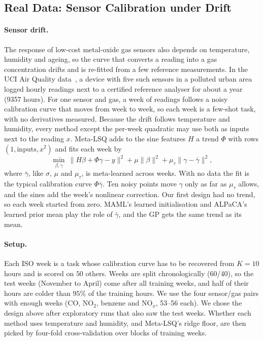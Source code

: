 \documentclass[fullpaper,final]{nldl}
\theoremstyle{plain}
\theoremstyle{definition}
\begin{document}
\subsection{Real Data: Sensor Calibration under Drift}
\label{sec:exp-real}

\paragraph{Sensor drift.} The response of low-cost metal-oxide gas sensors also
depends on temperature, humidity and ageing, so the curve that converts a reading into a gas concentration drifts and is
re-fitted from a few reference measurements. In the UCI Air Quality
data~\citep{devito2008airquality}, a device with five such sensors in a polluted
urban area logged hourly readings next to a certified reference analyser for about a
year (9357 hours). For one sensor and gas, a week of readings follows a
noisy calibration curve that moves from week to week, so each week is a few-shot
task, with no derivatives measured. Because the drift follows temperature and
humidity, every method except the per-week quadratic may use both as inputs next
to the reading $x$. Meta-LSQ adds
to the sine features $H$ a trend $\Phi$ with rows $(1,\text{inputs},x^2)$ and fits
each week by
\begin{equation}
\label{eq:prior-mean}
\min_{\beta,\gamma}\ \|H\beta+\Phi\gamma-y\|^2+\mu\|\beta\|^2+\mu_\tau\|\gamma-\bar\gamma\|^2,
\end{equation}
where $\bar\gamma$, like $\sigma$, $\mu$ and $\mu_\tau$, is meta-learned across weeks.
With no data the fit is the typical calibration curve $\Phi\bar\gamma$. Ten noisy
points move $\gamma$ only as far as $\mu_\tau$ allows, and the sines add the week's
nonlinear correction. Our first design had no trend, so each week started from zero.
MAML's learned initialisation and ALPaCA's learned prior mean play the role of
$\bar\gamma$, and the GP gets the same trend as its mean.

\paragraph{Setup.} Each ISO week is a task whose calibration curve has to be
recovered from $K{=}10$ hours and is scored on $50$ others. Weeks are split
chronologically (60/40), so the test weeks (November to April) come after all
training weeks, and half of their hours are colder than $95\%$ of the training hours.
We use the four sensor/gas pairs with enough weeks (CO, NO$_2$, benzene and NO$_x$,
53--56 each). We chose the design above after exploratory runs that also saw the test
weeks. Whether each method uses temperature and humidity, and Meta-LSQ's ridge floor,
are then picked by four-fold cross-validation over blocks of training weeks.
\end{document}
